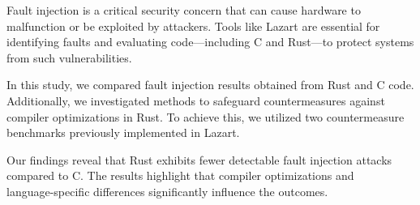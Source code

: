 Fault injection is a critical security concern that can cause hardware to malfunction or be exploited by attackers. Tools like Lazart are essential for identifying faults and evaluating code—including C and Rust—to protect systems from such vulnerabilities.

In this study, we compared fault injection results obtained from Rust and C code.\\
Additionally, we investigated methods to safeguard countermeasures against compiler optimizations in Rust. To achieve this, we utilized two countermeasure benchmarks previously implemented in Lazart.

Our findings reveal that Rust exhibits fewer detectable fault injection attacks compared to C. The results highlight that compiler optimizations and \\language-specific differences significantly influence the outcomes.